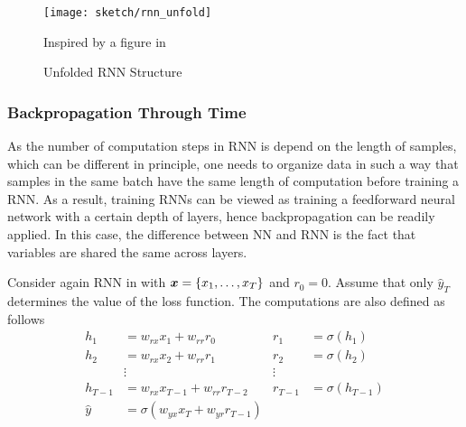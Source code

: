 \begin{figure}[!hbt]
\centering
\texttt{[image: sketch/rnn\_unfold]}
\caption{Unfolded RNN Structure}
\small{Inspired by a figure in \cite{OlahUnderstandingLSTMNetworks2015} }
\label{fig:rnn_unfold} 
\end{figure}


\subsubsection{Backpropagation Through Time}
As the number of computation steps in RNN is depend on the length of samples, which can be different in principle, one needs to organize data in such a way that samples in the same batch have the same  length of computation before training a RNN. As a result, training RNNs can be viewed as training a feedforward neural network with a certain depth of layers, hence backpropagation can be readily applied. In this case, the difference between NN and RNN is the fact that variables are shared the same across layers.

Consider again RNN in \addfigure{\ref{fig:rnn_unfold}} with $\boldsymbol{x} = \{x_1, \dots, x_T \}$ and $r_0 = 0$. Assume that only $\hat{y}_T$ determines the value of the loss function. The computations are also defined as follows 
\begin{align}
	h_1 &= w_{rx} x_1 + w_{rr} r_0 & r_1 &= \sigma(h_1) \label{eq:naive_r} \\
	h_2 &= w_{rx} x_2 + w_{rr} r_1 &  r_2 &= \sigma(h_2) \\
	& \vdots & \vdots \\
	h_{T-1} &= w_{rx} x_{T-1} + w_{rr} r_{T-2} &  r_{T-1} &= \sigma(h_{T-1}) \\
	\hat{y} &= \sigma(w_{yx} x_T   + w_{yr} r_{T-1})
\end{align}

